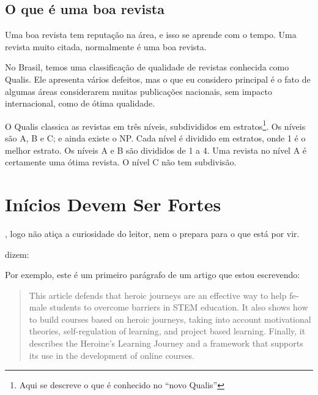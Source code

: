 \documentclass[openany]{book}
\begin{document}
\section{O que é uma boa revista}

Uma boa revista tem reputação na área, e isso se aprende com o tempo. Uma revista muito citada, normalmente é uma boa revista.

No Brasil, temos uma classificação de qualidade de revistas conhecida como Qualis. Ele apresenta vários defeitos, mas o que eu considero principal é o fato de algumas áreas considerarem muitas publicações nacionais, sem impacto internacional, como de ótima qualidade.

O Qualis classica as revistas em três níveis, subdivididos em estratos\footnote{Aqui se descreve o que é conhecido no ``novo Qualis''}. Os níveis são A, B e C; e ainda existe o NP.  Cada nível é dividido em estratos, onde 1 é o melhor estrato. Os níveis A e B são divididos de 1 a 4. Uma revista no nível A é certamente uma ótima revista. O nível C não tem subdivisão.


\chapter{Inícios Devem Ser Fortes}

, logo não atiça a curiosidade do leitor, nem o prepara para o que está por vir.

\citeauthor{Knuth:1997} dizem:


 Por exemplo, este é um primeiro parágrafo de um artigo que estou escrevendo:

\foreignblockquote{english}{This article defends that heroic journeys are an effective way to help female students to overcome barriers in STEM education.
It also shows how to build courses based on heroic journeys, taking into account motivational theories, self-regulation of learning, and project based learning. Finally, it describes the Heroine's Learning  Journey and a framework that  supports its use in the development of online courses.}
\end{document}
